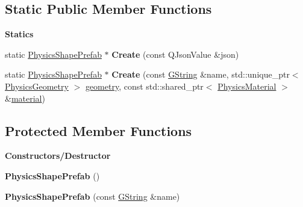 \subsection*{Static Public Member Functions}
\begin{Indent}\textbf{ Statics}\par
\begin{DoxyCompactItemize}
\item 
\mbox{\label{classrev_1_1_physics_shape_prefab_ac806b1224fe2b4ac76ad32cbdb31549c}} 
static \mbox{\hyperlink{classrev_1_1_physics_shape_prefab}{Physics\+Shape\+Prefab}} $\ast$ {\bfseries Create} (const Q\+Json\+Value \&json)
\item 
\mbox{\label{classrev_1_1_physics_shape_prefab_a65350db76dbcd0dc75d2b269c094e2c7}} 
static \mbox{\hyperlink{classrev_1_1_physics_shape_prefab}{Physics\+Shape\+Prefab}} $\ast$ {\bfseries Create} (const \mbox{\hyperlink{classrev_1_1_g_string}{G\+String}} \&name, std\+::unique\+\_\+ptr$<$ \mbox{\hyperlink{classrev_1_1_physics_geometry}{Physics\+Geometry}} $>$ \mbox{\hyperlink{classrev_1_1_physics_shape_prefab_af8ec025e86caef3a7ab7bcfae5254aef}{geometry}}, const std\+::shared\+\_\+ptr$<$ \mbox{\hyperlink{classrev_1_1_physics_material}{Physics\+Material}} $>$ \&\mbox{\hyperlink{classrev_1_1_physics_shape_prefab_ae547f85cd93185ef6701d08ef978bd4e}{material}})
\end{DoxyCompactItemize}
\end{Indent}
\subsection*{Protected Member Functions}
\begin{Indent}\textbf{ Constructors/\+Destructor}\par
\begin{DoxyCompactItemize}
\item 
\mbox{\label{classrev_1_1_physics_shape_prefab_ab51375b826f11aa2c527bc697db725ca}} 
{\bfseries Physics\+Shape\+Prefab} ()
\item 
\mbox{\label{classrev_1_1_physics_shape_prefab_ad0a5861d956982c79945a85b38978a97}} 
{\bfseries Physics\+Shape\+Prefab} (const \mbox{\hyperlink{classrev_1_1_g_string}{G\+String}} \&name)
\end{DoxyCompactItemize}
\end{Indent}
